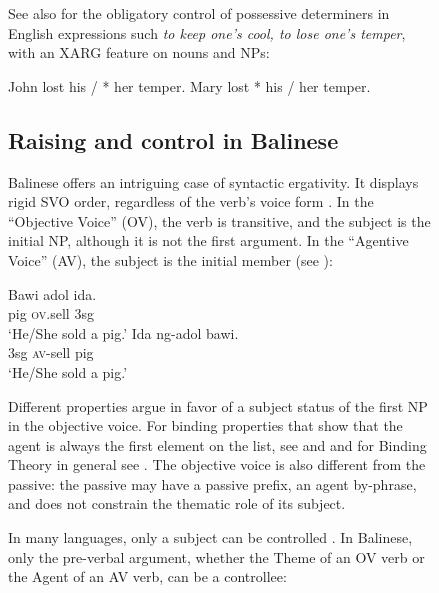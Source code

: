 \documentclass[output=paper
                ,modfonts
                ,nonflat
	        ,collection
	        ,collectionchapter
	        ,collectiontoclongg
 	        ,biblatex
                ,babelshorthands
                ,newtxmath
                ,draftmode
                ,colorlinks, citecolor=brown
]{./langsci/langscibook}
\begin{document}
\begin{figure}
 See also \citet{SagKay2009} for the obligatory control of possessive determiners in English expressions such \emph{to keep one's cool, to lose one's temper}, with an XARG feature on nouns and NPs:
\begin{exe}
\ex \begin{xlist}
\ex John lost his / * her temper.
\ex Mary lost * his / her temper.
\end{xlist}
\end{exe}


\subsection{Raising and control in Balinese}
Balinese offers an intriguing case of syntactic ergativity. It displays rigid SVO order, regardless of the verb's voice form \citep{WechslerandArka1998}. In the ``Objective Voice'' (OV), the verb is transitive, and the subject is the initial NP, although it is not the first argument. In the ``Agentive Voice'' (AV), the subject is the \argst initial member (see ):

\begin{exe}
\ex \begin{xlist}
\ex \gll Bawi adol ida. \\
pig \textsc{ov}.sell 3sg \\
\glt `He/She sold a pig.' 
\ex  \gll Ida ng-adol bawi.\\
3sg \textsc{av}-sell pig\\
\glt `He/She sold a pig.'
\end{xlist}
\end{exe}

Different properties argue in favor of a subject status of the first NP in the objective voice. For
binding properties that show that the agent is always the first element on the \argst list, see
 and  and for Binding Theory in general see . The objective voice is also different from the passive: the passive may have a passive prefix, an agent by-phrase, and does not constrain the thematic role of its subject.

In many languages, only a subject
can be controlled \citep{Zaenenetal1985}. In Balinese, only the pre-verbal argument, whether the Theme of an OV verb or the Agent of an AV verb, can be a controllee:


\end{figure}
\end{document}
